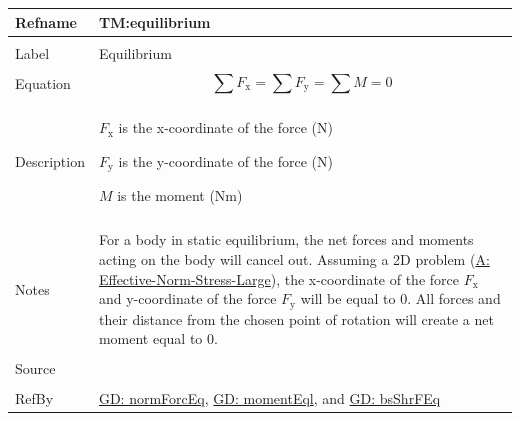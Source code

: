 \documentclass[12pt]{article}
\begin{document}
\noindent \begin{minipage}{\textwidth}
\begin{tabular}{>{\raggedright}p{}>{\raggedright\arraybackslash}p{}}
\toprule \textbf{Refname} & \textbf{TM:equilibrium}
\label{TM:equilibrium}
\\ \midrule \\
Label & Equilibrium
\\ \midrule \\
Equation & \begin{displaymath}
           \displaystyle\sum{{F_{\text{x}}}}=\displaystyle\sum{{F_{\text{y}}}}=\displaystyle\sum{M}=0
           \end{displaymath}
\\ \midrule \\
Description & \begin{symbDescription}
              \item{${F_{\text{x}}}$ is the x-coordinate of the force (N)}
              \item{${F_{\text{y}}}$ is the y-coordinate of the force (N)}
              \item{$M$ is the moment (Nm)}
              \end{symbDescription}
\\ \midrule \\
Notes & For a body in static equilibrium, the net forces and moments acting on the body will cancel out. Assuming a 2D problem (\hyperref[assumpENSL]{A: Effective-Norm-Stress-Large}), the x-coordinate of the force ${F_{\text{x}}}$ and y-coordinate of the force ${F_{\text{y}}}$ will be equal to $0$. All forces and their distance from the chosen point of rotation will create a net moment equal to $0$.
\\ \midrule \\
Source & \cite{fredlund1977}
\\ \midrule \\
RefBy & \hyperref[GD:normForcEq]{GD: normForcEq}, \hyperref[GD:momentEql]{GD: momentEql}, and \hyperref[GD:bsShrFEq]{GD: bsShrFEq}
\\ \bottomrule
\end{tabular}
\end{minipage}
\par~
\end{document}
